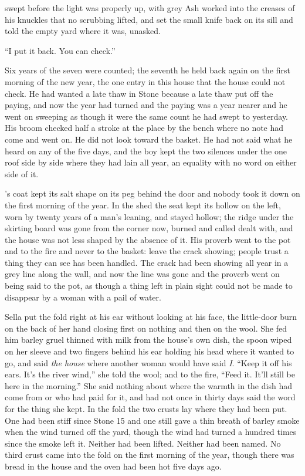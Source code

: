  swept before the light was properly up, with grey Ash worked into the creases of his knuckles that no scrubbing lifted, and set the small knife back on its sill and told the empty yard where it was, unasked.

“I put it back. You can check.”

Six years of the seven were counted; the seventh he held back again on the first morning of the new year, the one entry in this house that the house could not check. He had wanted a late thaw in Stone because a late thaw put off the paying, and now the year had turned and the paying was a year nearer and he went on sweeping as though it were the same count he had swept to yesterday. His broom checked half a stroke at the place by the bench where no note had come and went on. He did not look toward the basket. He had not said what he heard on any of the five days, and the boy kept the two silences under the one roof side by side where they had lain all year, an equality with no word on either side of it.

's coat kept its salt shape on its peg behind the door and nobody took it down on the first morning of the year. In the shed the seat kept its hollow on the left, worn by twenty years of a man's leaning, and stayed hollow; the ridge under the skirting board was gone from the corner now, burned and called dealt with, and the house was not less shaped by the absence of it. His proverb went to the pot and to the fire and never to the basket: leave the crack showing; people trust a thing they can see has been handled. The crack had been showing all year in a grey line along the wall, and now the line was gone and the proverb went on being said to the pot, as though a thing left in plain sight could not be made to disappear by a woman with a pail of water.

Sella put the fold right at his ear without looking at his face, the little-door burn on the back of her hand closing first on nothing and then on the wool. She fed him barley gruel thinned with milk from the house's own dish, the spoon wiped on her sleeve and two fingers behind his ear holding his head where it wanted to go, and said \emph{the house} where another woman would have said \emph{I}. “Keep it off his ears. It's the river wind,” she told the wool; and to the fire, “Feed it. It'll still be here in the morning.” She said nothing about where the warmth in the dish had come from or who had paid for it, and had not once in thirty days said the word for the thing she kept. In the fold the two crusts lay where they had been put. One had been stiff since Stone 15 and one still gave a thin breath of barley smoke when the wind turned off the yard, though the wind had turned a hundred times since the smoke left it. Neither had been lifted. Neither had been named. No third crust came into the fold on the first morning of the year, though there was bread in the house and the oven had been hot five days ago.

